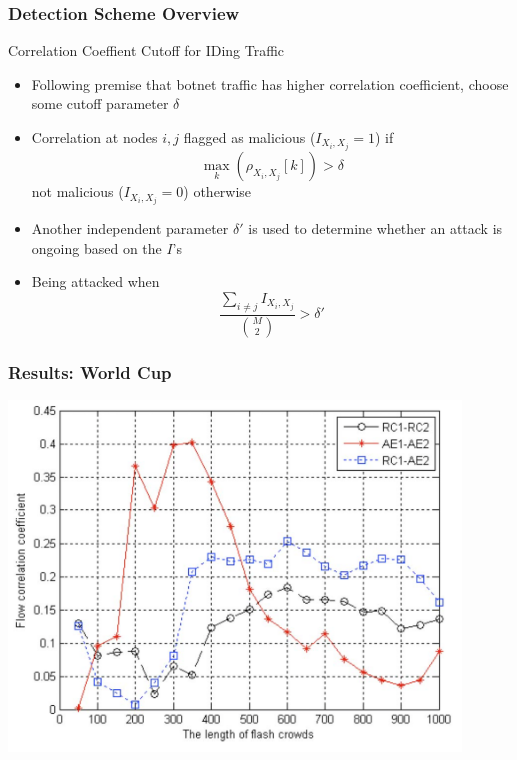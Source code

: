 \documentclass[10pt,mathserif]{beamer}
\begin{document}
\begin{frame}
\begin{columns}[T]
\begin{column}{0.5\textwidth}
    \end{column}
  \end{columns}
\end{frame}

\begin{frame}
  \frametitle{Detection Scheme Overview}
  \begin{block}{Correlation Coeffient Cutoff for IDing Traffic}
    \begin{itemize}
      \item Following premise that botnet traffic has higher correlation
        coefficient, choose some cutoff parameter $\delta$
      \item Correlation at nodes $i,j$ flagged as malicious
        ($I_{X_i,X_j} = 1$) if
        \[\max_k(\rho_{X_i,X_j}\left[ k \right]) > \delta\]
        not malicious ($I_{X_i,X_j} = 0$) otherwise
      \item Another independent parameter $\delta'$ is used to
        determine whether an attack is ongoing based on the $I$'s
      \item Being attacked when
        \[\frac{\sum_{i\neq j}I_{X_i,X_j}}{\binom{M}{2}} > \delta'\]
    \end{itemize}
  \end{block}
\end{frame}

\begin{frame}
  \frametitle{Results: World Cup}
  \includegraphics[width=0.9\textwidth,natwidth=1034,natheight=802]{figures/world_cup.png}
\end{frame}
\end{document}
